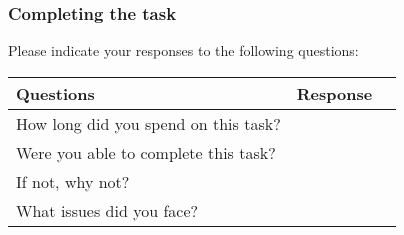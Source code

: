 \subsubsection{Completing the task}

Please indicate your responses to the following questions:

\begin{table}[h]
\centering
\renewcommand{\arraystretch}{1.5} %
\begin{tabularx}{\textwidth}{|X|X|c|} %
\hline
\textbf{Questions} & \textbf{Response} \\ \hline
How long did you spend on this task? &  \\ \hline
Were you able to complete this task?\newline & \\ \hline
If not, why not?\newline\newline\newline\newline & \\ \hline
What issues did you face?\newline\newline\newline\newline &\\ \hline
\end{tabularx}
\end{table}
